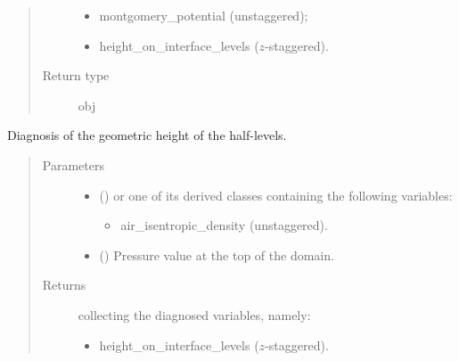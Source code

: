 \documentclass[letterpaper,10pt,english]{sphinxmanual}
\begin{document}
\begin{fulllineitems}
\begin{fulllineitems}
\begin{quote}
\begin{description}
\begin{itemize}
\item {} 
montgomery\_potential (unstaggered);

\item {} 
height\_on\_interface\_levels (\(z\)-staggered).

\end{itemize}


\item[{Return type}] \leavevmode
obj

\end{description}\end{quote}

\end{fulllineitems}


\begin{fulllineitems}
\label{\detokenize{api:dycore.diagnostic_isentropic.DiagnosticIsentropic.get_height}}
Diagnosis of the geometric height of the half-levels.
\begin{quote}\begin{description}
\item[{Parameters}] \leavevmode\begin{itemize}
\item {} 
 () \textendash{} 
{\hyperref[\detokenize{api:storages.grid_data.GridData}]{}} or one of its derived classes containing the following variables:
\begin{itemize}
\item {} 
air\_isentropic\_density (unstaggered).

\end{itemize}


\item {} 
 () \textendash{} Pressure value at the top of the domain.

\end{itemize}

\item[{Returns}] \leavevmode

{\hyperref[\detokenize{api:storages.grid_data.GridData}]{}} collecting the diagnosed variables, namely:
\begin{itemize}
\item {} 
height\_on\_interface\_levels (\(z\)-staggered).


\end{itemize}
\end{description}
\end{quote}
\end{fulllineitems}
\end{fulllineitems}
\end{document}
